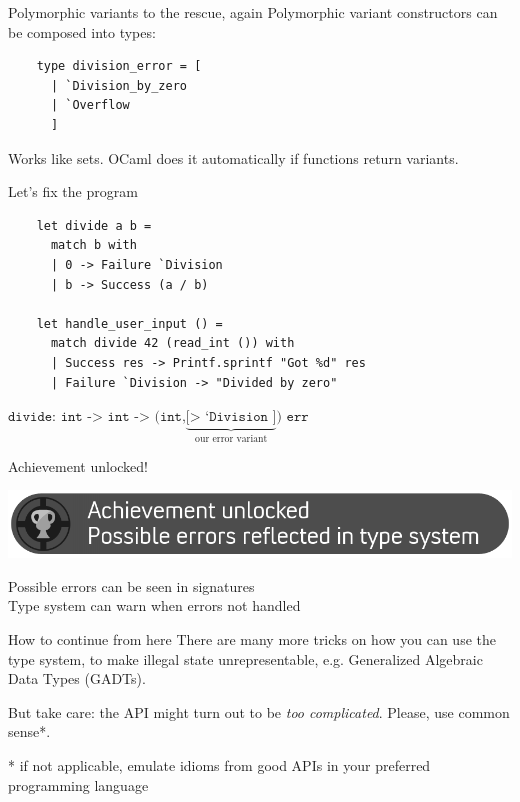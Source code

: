 \documentclass{beamer}
\begin{document}
\begin{frame}[fragile]{Polymorphic variants to the rescue, again}
  Polymorphic variant constructors can be composed into types:
  \begin{verbatim}
    type division_error = [
      | `Division_by_zero
      | `Overflow
      ]
  \end{verbatim}
  Works like sets. OCaml does it automatically if functions return variants.
\end{frame}

\begin{frame}[fragile]
  Let's fix the program
  \begin{verbatim}
    let divide a b =
      match b with
      | 0 -> Failure `Division
      | b -> Success (a / b)

    let handle_user_input () =
      match divide 42 (read_int ()) with
      | Success res -> Printf.sprintf "Got %d" res
      | Failure `Division -> "Divided by zero"
  \end{verbatim}

  $\texttt{divide: int -> int -> (int,}
  \underbrace{\texttt{[> `Division ]}}_{\text{our error variant}}
    \texttt{) err}$
\end{frame}

\begin{frame}{Achievement unlocked!}
  \begin{center}
    \includegraphics[width=\textwidth]{achivement-error-types}
  \end{center}
  \checkmark Possible errors can be seen in signatures\\
  \checkmark Type system can warn when errors not handled
\end{frame}

\begin{frame}{How to continue from here}
  There are many more tricks on how you can use the type system, to make illegal
  state unrepresentable, e.g. Generalized Algebraic Data Types (GADTs).

  But take care: the API might turn out to be \emph{too complicated}. Please, use
  common sense*.

  \pause
  * if not applicable, emulate idioms from good APIs in your preferred programming
  language \smiley{}
\end{frame}
\end{document}
